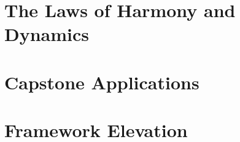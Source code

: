 \part{The Laws of Harmony and Dynamics}

\newpage

\newpage

\newpage

\newpage

\newpage

\newpage

\newpage

\newpage

\newpage

\newpage

\newpage

\newpage

\newpage

\newpage

\newpage

\part{Capstone Applications}

\newpage


\newpage


\part{Framework Elevation}

\newpage

\newpage





